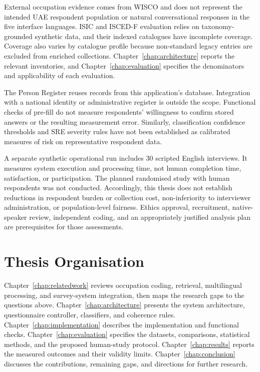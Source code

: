 External occupation evidence comes from WISCO and does not represent
the intended UAE respondent population or natural conversational responses
in the five interface languages.
ISIC and ISCED-F evaluation relies on taxonomy-grounded synthetic data,
and their indexed catalogues have incomplete coverage. Coverage also
varies by catalogue profile because non-standard legacy entries are
excluded from enriched collections. Chapter~\ref{chap:architecture}
reports the relevant inventories, and Chapter~\ref{chap:evaluation}
specifies the denominators and applicability of each evaluation.

The Person Register reuses records from this application's database.
Integration with a national identity or administrative register is
outside the scope. Functional checks of pre-fill do not measure
respondents' willingness to confirm stored answers or the resulting
measurement error. Similarly, classification confidence thresholds and
SRE severity rules have not been established as calibrated measures of
risk on representative respondent data.

A separate synthetic operational run includes 30 scripted English
interviews. It measures system execution and processing time, not human
completion time, satisfaction, or participation. The planned randomised
study with human respondents was not conducted. Accordingly, this thesis
does not establish reductions in respondent burden or collection cost,
non-inferiority to interviewer administration, or population-level
fairness. Ethics approval, recruitment, native-speaker review, independent
coding, and an appropriately justified analysis plan are prerequisites
for those assessments.

\section{Thesis Organisation}
\label{sec:organisation}

Chapter~\ref{chap:relatedwork} reviews occupation coding, retrieval,
multilingual processing, and survey-system integration, then maps the
research gaps to the questions above.
Chapter~\ref{chap:architecture} presents the system architecture,
questionnaire controller, classifiers, and coherence rules.
Chapter~\ref{chap:implementation} describes the implementation and
functional checks.
Chapter~\ref{chap:evaluation} specifies the datasets, comparisons,
statistical methods, and the proposed human-study protocol.
Chapter~\ref{chap:results} reports the measured outcomes and their validity
limits.
Chapter~\ref{chap:conclusion} discusses the contributions, remaining gaps,
and directions for further research.
